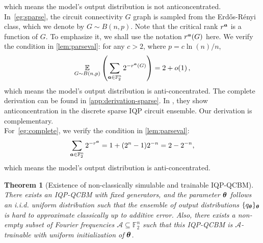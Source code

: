 \documentclass{article}
\theoremstyle{plain}
\newtheorem{theorem}{Theorem}[section]
\theoremstyle{definition}
\theoremstyle{remark}
\begin{document}
which means the model's output distribution is not anticoncentrated. \\
In~\cref{eg:sparse}, the circuit connectivity $G$ graph is sampled from the Erd\H os-R\'enyi class, which we denote by $G\sim B(n,p)$. Note that the critical rank $r^{{\bm{a}}}$ is a function of $G$. To emphasize it, we shall use the notation $r^{{\bm{a}}}(G)$ here. We verify the condition in \cref{lem:parseval}: for any $c>2$, where $p=c\ln(n)/n$,
\begin{equation}\label{eq:anti-concentration-sparse}
\operatorname*{\mathbb{E}}_{G\sim B(n,p)}\left(\sum_{{\bm{a}} \in \mathbb{F}_2^n}  2^{-r^{\bm{a}}(G)}\right)
= 2 + o(1)\,,
\end{equation} 
which means the model's output distribution is anti-concentrated. The complete derivation can be found in \cref{app:derivation-sparse}. In \cite{Bremner17}, they show anticoncentration in the discrete sparse IQP circuit ensemble. Our derivation is complementary. 
\\
For~\cref{eg:complete}, we verify the condition in \cref{lem:parseval}: \begin{equation}
\sum_{{\bm{a}} \in \mathbb{F}_2^n} 2^{-r^{\bm{a}}}
= 1+(2^n-1)2^{-n} = 2 - 2^{-n},
\end{equation}
which means the model's output distribution is anti-concentrated. 
\begin{theorem}[Existence of non-classically simulable and trainable IQP-QCBM]
\label{thm:ac_and_pst_exist}
There exists an IQP-QCBM with fixed generators, and the parameter ${\bm{\theta}}$ follows an i.i.d. uniform distribution such that the ensemble of output distributions $\{q_{\bm{\theta}}\}_{\bm{\theta}}$ is hard to approximate classically up to additive error. Also, there exists a non-empty subset of Fourier frequencies $\mathcal{A} \subseteq \mathbb{F}_2^n$ such that this IQP-QCBM is $\mathcal{A}$-trainable with uniform initialization of ${\bm{\theta}}$.
\end{theorem}
\end{document}

